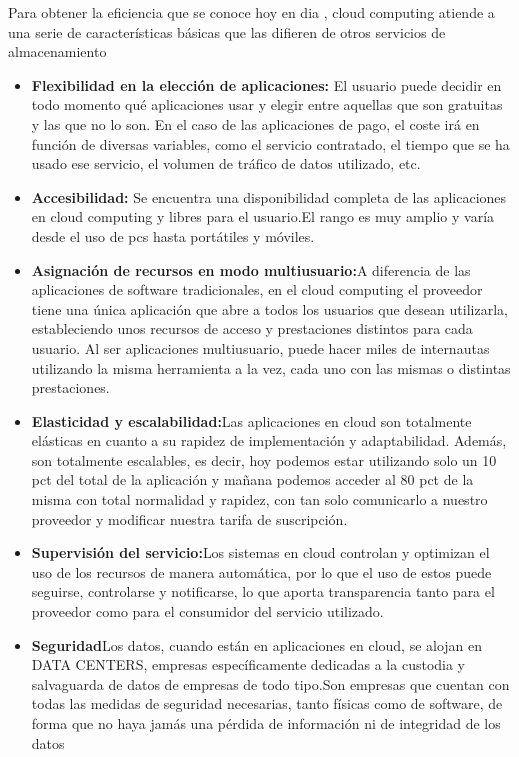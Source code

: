 \documentclass[12pt,a4paper]{article}
\begin{document}
Para obtener la eficiencia que se conoce hoy en dia , cloud
computing atiende a una serie de características básicas que las
difieren de otros servicios de almacenamiento
\begin {itemize}
\item \textbf{Flexibilidad en la elección de aplicaciones:} El
usuario puede decidir en todo momento qué aplicaciones usar y
elegir entre aquellas que son gratuitas y las que no lo son. En
el caso de las aplicaciones de pago, el coste irá en función de
diversas variables, como el servicio contratado, el tiempo que
se ha usado ese servicio, el volumen de tráfico de datos
utilizado, etc.
\item \textbf{Accesibilidad:} Se encuentra una disponibilidad
completa de las aplicaciones en cloud computing y libres para el
usuario.El rango es muy amplio y varía desde el uso de pcs hasta
portátiles y móviles.

\item \textbf{Asignación de recursos en modo multiusuario:}A
diferencia de las aplicaciones de software tradicionales, en el
cloud computing el proveedor tiene una única aplicación que abre
a todos los usuarios que desean utilizarla, estableciendo unos
recursos de acceso y prestaciones distintos para cada usuario.
Al ser aplicaciones multiusuario, puede hacer miles de
internautas utilizando la misma herramienta a la vez, cada uno
con las mismas o distintas prestaciones.

\item \textbf{Elasticidad y escalabilidad:}Las aplicaciones en
cloud son totalmente elásticas en cuanto a su rapidez de
implementación y adaptabilidad. Además, son totalmente
escalables, es decir, hoy podemos estar utilizando solo un 10
pct del total de la aplicación y mañana podemos acceder al 80
pct de la misma con total normalidad y rapidez, con tan solo
comunicarlo a nuestro proveedor y modificar nuestra tarifa de
suscripción.
 
\item \textbf{Supervisión del servicio:}Los sistemas en cloud
controlan y optimizan el uso de los recursos de manera
automática, por lo que el uso de estos puede seguirse,
controlarse y notificarse, lo que aporta transparencia tanto
para el proveedor como para el consumidor del servicio
utilizado.
 
\item \textbf{Seguridad}Los datos, cuando están en aplicaciones
en cloud, se alojan en DATA CENTERS, empresas específicamente
dedicadas a la custodia y salvaguarda de datos de empresas de
todo tipo.Son empresas que cuentan con todas las medidas de
seguridad necesarias, tanto físicas como de software, de forma
que no haya jamás una pérdida de información ni de integridad de
los datos
\end{itemize}
\end{document}
